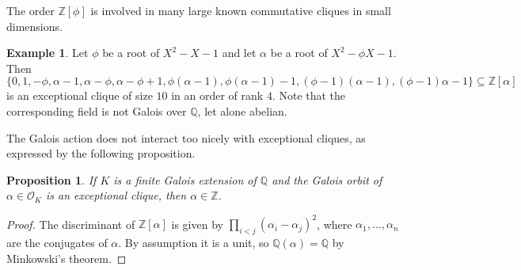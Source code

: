 \documentclass{amsart}
\theoremstyle{plain}
\newtheorem{proposition}[theorem]{Proposition}
\theoremstyle{definition}
\newtheorem{example}[theorem]{Example}
\newcommand{\Z}{\ensuremath{\mathbb{Z}}}
\newcommand{\Q}{\ensuremath{\mathbb{Q}}}
\begin{document}
The order \(\Z[\phi]\) is involved in many large known commutative cliques in small dimensions.

\begin{example}\label{ex:nf_deg_4}
	Let \(\phi\) be a root of \(X^2-X-1\) and let \(\alpha\) be a root of \(X^2-\phi X-1\). Then 
	\[\{0,1,-\phi,\alpha-1,\alpha-\phi,\alpha-\phi+1,\phi(\alpha-1),\phi(\alpha-1)-1,(\phi-1)(\alpha-1),(\phi-1)\alpha-1\} \subseteq \Z[\alpha]\]
	is an exceptional clique of size \(10\) in an order of rank \(4\). Note that the corresponding field is not Galois over \(\Q\), let alone abelian.
\end{example}

The Galois action does not interact too nicely with exceptional cliques, as expressed by the following proposition.

\begin{proposition}\label{prop:no_galois_clique}
	If \(K\) is a finite Galois extension of \(\Q\) and the Galois orbit of \(\alpha\in\mathcal{O}_K\) is an exceptional clique, then \(\alpha\in\Z\).
\end{proposition}
\begin{proof}
	The discriminant of \(\Z[\alpha]\) is given by \(\prod_{i<j} (\alpha_i-\alpha_j)^2\), where \(\alpha_1,\dotsc,\alpha_n\) are the conjugates of \(\alpha\). By assumption it is a unit, so \(\Q(\alpha)=\Q\) by Minkowski's theorem.
\end{proof}


\end{document}
